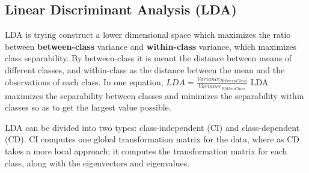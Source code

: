 \subsection*{Linear Discriminant Analysis (LDA)}
LDA is trying construct a lower dimensional space which maximizes the ratio between \textbf{between-class} variance and \textbf{within-class} variance, which maximizes class separability. By between-class it is meant the distance between means of different classes, and within-class as the distance between the mean and the observations of each class. In one equation, $LDA = \frac{Variance_{BetweenClass}}{Variance_{WithinClass}}$ LDA maximizes the separability between classes and minimizes the separability within classes so as to get the largest value possible.

\begin{comment}
@misc{LDA2,
      organization = {University of Salford Manchester},
      url          = {http://usir.salford.ac.uk/id/eprint/52074/1/AI\_Com\_LDA\_Tarek.pdf},
      title        = {Linear discriminant analysis: a detailed tutorial},
      urldate      = {2022-10-11}
    }
    \end{comment} 
    
LDA can be divided into two types: class-independent (CI) and class-dependent (CD). CI computes one global transformation matrix for the data, where as CD takes a more local approach; it computes the transformation matrix for each class, along with the eigenvectors and eigenvalues.\cite{LDA2}

